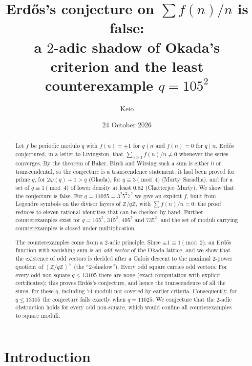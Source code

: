 \documentclass[11pt]{amsart}
\theoremstyle{definition}
\theoremstyle{remark}
\providecommand{\Z}{\mathbb Z}
\numberwithin{equation}{section}
\begin{document}
\title[Erd\H{o}s's conjecture on $\sum f(n)/n$ is false]{Erd\H{o}s's conjecture on $\sum f(n)/n$ is false:\\ a $2$-adic shadow of Okada's criterion and the least counterexample $q=105^2$}
\author{Keio}
\date{24 October 2026}

\begin{abstract}
Let $f$ be periodic modulo $q$ with $f(n)=\pm1$ for $q\nmid n$ and $f(n)=0$ for $q\mid n$.
Erd\H{o}s conjectured, in a letter to Livingston, that $\sum_{n\ge1}f(n)/n\neq0$ whenever the series converges.
By the theorem of Baker, Birch and Wirsing such a sum is either $0$ or transcendental, so the conjecture is a transcendence statement; it had been proved for prime $q$, for $2\varphi(q)+1>q$ (Okada), for $q\equiv3\pmod 4$ (Murty--Saradha), and for a set of $q\equiv1\pmod4$ of lower density at least $0.82$ (Chatterjee--Murty).
We show that the conjecture is false.
For $q=11025=3^2 5^2 7^2$ we give an explicit $f$, built from Legendre symbols on the divisor layers of $\Z/q\Z$, with $\sum f(n)/n=0$; the proof reduces to eleven rational identities that can be checked by hand.
Further counterexamples exist for $q=165^2$, $315^2$, $495^2$ and $735^2$, and the set of moduli carrying counterexamples is closed under multiplication.

The counterexamples come from a $2$-adic principle.
Since $\pm1\equiv1\pmod 2$, an Erd\H{o}s function with vanishing sum is an \emph{odd vector} of the Okada lattice, and we show that the existence of odd vectors is decided after a Galois descent to the maximal $2$-power quotient of $(\Z/q\Z)^\times$ (the ``$2$-shadow'').
Every odd square carries odd vectors.
For every odd non-square $q\le13105$ there are none (exact computation with explicit certificates); this proves Erd\H{o}s's conjecture, and hence the transcendence of all the sums, for these $q$, including $74$ moduli not covered by earlier criteria.
Consequently, for $q\le 13105$ the conjecture fails exactly when $q=11025$.
We conjecture that the $2$-adic obstruction holds for every odd non-square, which would confine all counterexamples to square moduli.
\end{abstract}
\maketitle
\tableofcontents

\section{Introduction}\label{sec:intro}
\end{document}
